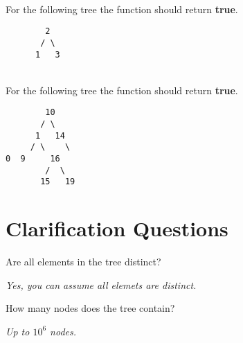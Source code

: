 \begin{example}
	\hfill \\
	For the following tree the function should return \textbf{true}.
	\begin{verbatim}
	    2
	   / \
	  1   3
	\end{verbatim}
	
\end{example}

\begin{example}
\label{example:verify_BST_:one}
	\hfill \\
	For the following tree the function should return \textbf{true}.
	\begin{verbatim}
	    10
	   / \
	  1   14
	 / \    \
0  9     16
        /  \
       15   19
	\end{verbatim}
	
\end{example}


\section{Clarification Questions}

\begin{QandA}
	\item \begin{questionitem} \begin{question} Are all elements in the tree distinct?  \end{question} 	 
    \begin{answered}
		\textit{Yes, you can assume all elemets are distinct.}
	\end{answered} \end{questionitem}
	\item \begin{questionitem} \begin{question} How many nodes does the tree contain?  \end{question} 	 
    \begin{answered}
		\textit{Up to $10^6$ nodes.}
	\end{answered} \end{questionitem}
\end{QandA}

